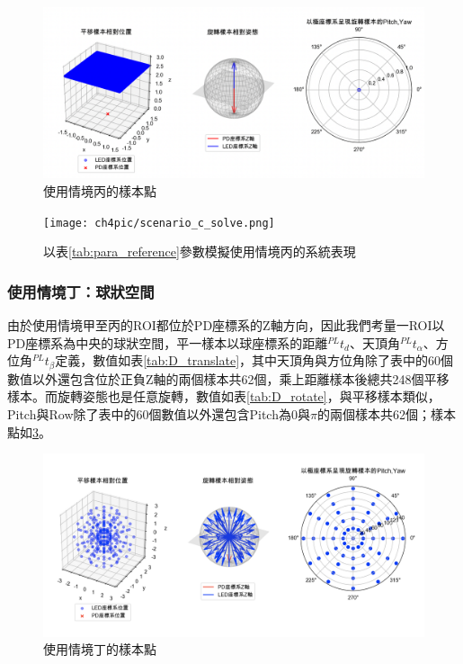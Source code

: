 \begin{figure}[htpb]
    \centering
    \includegraphics[width=15cm]{ch4pic/c_scenario.png}
    \caption{使用情境丙的樣本點}
    \label{pic:c_scenario}
\end{figure}

\begin{figure}[htpb]
    \centering
    \texttt{[image: ch4pic/scenario\_c\_solve.png]}
    \caption{以表\ref{tab:para_reference}參數模擬使用情境丙的系統表現}
    \label{pic:scenario_c_solve}
\end{figure}


\subsubsection{使用情境丁：球狀空間}


由於使用情境甲至丙的ROI都位於PD座標系的Z軸方向，因此我們考量一ROI以PD座標系為中央的球狀空間，平一樣本以球座標系的距離$^{PL}t_d$、天頂角$^{PL}t_{\alpha}$、方位角$^{PL}t_{\beta}$定義，數值如表\ref{tab:D_translate}，其中天頂角與方位角除了表中的60個數值以外還包含位於正負Z軸的兩個樣本共62個，乘上距離樣本後總共248個平移樣本。而旋轉姿態也是任意旋轉，數值如表\ref{tab:D_rotate}，與平移樣本類似，Pitch與Row除了表中的60個數值以外還包含Pitch為0與$\pi$的兩個樣本共62個；樣本點如\ref{pic:d_scenario}。

\begin{figure}[htpb]
    \centering
    \includegraphics[width=15cm]{ch4pic/d_scenario.png}
    \caption{使用情境丁的樣本點}
    \label{pic:d_scenario}
\end{figure}

